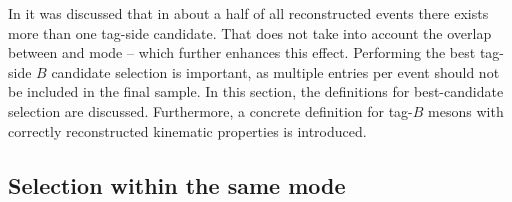 In  it was discussed that in about a half of all reconstructed events there exists more than one tag-side candidate.
That does not take into account the overlap between \feiBp and \feiBz mode -- which further enhances this effect.
Performing the best tag-side $B$ candidate selection is important, as multiple entries per event should not be included in the final sample.
In this section, the definitions for best-candidate selection are discussed.
Furthermore, a concrete definition for tag-$B$ mesons with correctly reconstructed kinematic properties is introduced.

\subsection{Selection within the same \FEI mode}